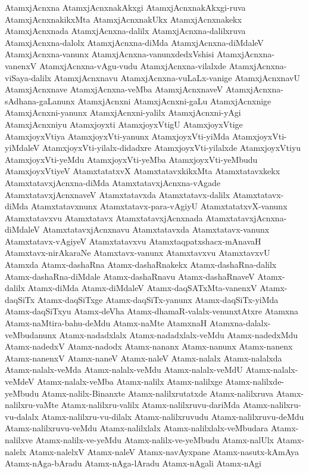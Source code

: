 {AtamxjAcnxna
AtamxjAcnxnakAkxgi
AtamxjAcnxnakAkxgi-ruva
AtamxjAcnxnakikxMta
AtamxjAcnxnakUkx
AtamxjAcnxnakekx
AtamxjAcnxnada
AtamxjAcnxna-dalilx
AtamxjAcnxna-dalilxruva
AtamxjAcnxna-dalolx
AtamxjAcnxna-diMda
AtamxjAcnxna-diMdaleV
AtamxjAcnxna-vanunx
AtamxjAcnxna-vanunxdedxVshisi
AtamxjAcnxna-vanenxV
AtamxjAcnxna-vAgu-vudu
AtamxjAcnxna-vilalxde
AtamxjAcnxna-viSaya-dalilx
AtamxjAcnxnavu
AtamxjAcnxna-vuLaLx-vanige
AtamxjAcnxnavU
AtamxjAcnxnave
AtamxjAcnxna-veMba
AtamxjAcnxnaveV
AtamxjAcnxna-sAdhana-gaLanunx
AtamxjAcnxni
AtamxjAcnxni-gaLu
AtamxjAcnxnige
AtamxjAcnxni-yanunx
AtamxjAcnxni-yalilx
AtamxjAcnxni-yAgi
AtamxjAcnxniyu
Atamxjoyxti
AtamxjoyxVtigU
AtamxjoyxVtige
AtamxjoyxVtiya
AtamxjoyxVti-yanunx
AtamxjoyxVti-yiMda
AtamxjoyxVti-yiMdaleV
AtamxjoyxVti-yilalx-didadxre
AtamxjoyxVti-yilalxde
AtamxjoyxVtiyu
AtamxjoyxVti-yeMdu
AtamxjoyxVti-yeMba
AtamxjoyxVti-yeMbudu
AtamxjoyxVtiyeV
AtamxtatatxvX
AtamxtatavxkikxMta
Atamxtatavxkekx
AtamxtatavxjAcnxna-diMda
AtamxtatavxjAcnxna-vAgade
AtamxtatavxjAcnxnaveV
Atamxtatavxda
Atamxtatavx-dalilx
Atamxtatavx-diMda
Atamxtatavxnunx
Atamxtatavx-para-vAgiyU
AtamxtatatxvX-vanunx
Atamxtatavxvu
Atamxtatavx
AtamxtatavxjAcnxnada
AtamxtatavxjAcnxna-diMdaleV
AtamxtatavxjAcnxnavu
Atamxtatavxda
Atamxtatavx-vanunx
Atamxtatavx-vAgiyeV
Atamxtatavxvu
Atamxtaqpatxshacx-mAnavaH
Atamxtavx-nirAkaraNe
Atamxtavx-vanunx
Atamxtavxvu
AtamxtavxvU
Atamxda
Atamx-dashaRna
Atamx-dashaRnakekx
Atamx-dashaRna-dalilx
Atamx-dashaRna-diMdale
Atamx-dashaRnavu
Atamx-dashaRnaveV
Atamx-dalilx
Atamx-diMda
Atamx-diMdaleV
Atamx-daqSATxMta-vanenxV
Atamx-daqSiTx
Atamx-daqSiTxge
Atamx-daqSiTx-yanunx
Atamx-daqSiTx-yiMda
Atamx-daqSiTxyu
Atamx-deVha
Atamx-dhamaR-valalx-venunxtAtxre
Atamxna
Atamx-naMtira-bahu-deMdu
Atamx-naMte
AtamxnaH
Atamxna-dalalx-veMbudanunx
Atamx-nadadxlalx
Atamx-nadadxlalx-veMdu
Atamx-nadedxMdu
Atamx-nadedxV
Atamx-nadodx
Atamx-nananx
Atamx-nanunx
Atamx-nanenx
Atamx-nanenxV
Atamx-naneV
Atamx-naleV
Atamx-nalalx
Atamx-nalalxda
Atamx-nalalx-veMda
Atamx-nalalx-veMdu
Atamx-nalalx-veMdU
Atamx-nalalx-veMdeV
Atamx-nalalx-veMba
Atamx-nalilx
Atamx-nalilxge
Atamx-nalilxde-yeMbudu
Atamx-nalilx-Binanxte
Atamx-nalilxrutatxde
Atamx-nalilxruva
Atamx-nalilxru-vaMte
Atamx-nalilxru-valilx
Atamx-nalilxruvu-dariMda
Atamx-nalilxru-vu-dalalx
Atamx-nalilxru-vu-dilalx
Atamx-nalilxruvudu
Atamx-nalilxruvu-deMdu
Atamx-nalilxruvu-veMdu
Atamx-nalilxlalx
Atamx-nalilxlalx-veMbudara
Atamx-nalilxve
Atamx-nalilx-ve-yeMdu
Atamx-nalilx-ve-yeMbudu
Atamx-nalUlx
Atamx-nalelx
Atamx-nalelxV
Atamx-naleV
Atamx-navAyxpane
Atamx-nasutx-kAmAya
Atamx-nAga-bAradu
Atamx-nAga-lAradu
Atamx-nAgali
Atamx-nAgi
}
